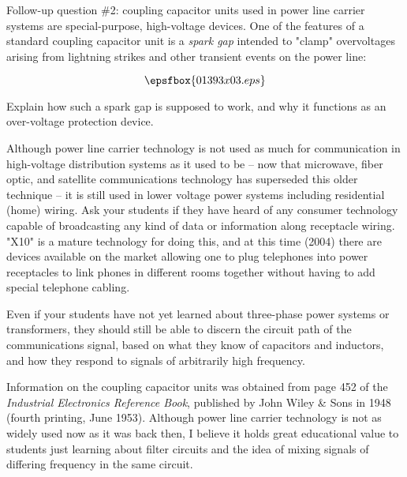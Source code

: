 \vskip 10pt

Follow-up question \#2: coupling capacitor units used in power line carrier systems are special-purpose, high-voltage devices.  One of the features of a standard coupling capacitor unit is a {\it spark gap} intended to "clamp" overvoltages arising from lightning strikes and other transient events on the power line:

$$\epsfbox{01393x03.eps}$$

Explain how such a spark gap is supposed to work, and why it functions as an over-voltage protection device.







Although power line carrier technology is not used as much for communication in high-voltage distribution systems as it used to be -- now that microwave, fiber optic, and satellite communications technology has superseded this older technique -- it is still used in lower voltage power systems including residential (home) wiring.  Ask your students if they have heard of any consumer technology capable of broadcasting any kind of data or information along receptacle wiring.  "X10" is a mature technology for doing this, and at this time (2004) there are devices available on the market allowing one to plug telephones into power receptacles to link phones in different rooms together without having to add special telephone cabling.

Even if your students have not yet learned about three-phase power systems or transformers, they should still be able to discern the circuit path of the communications signal, based on what they know of capacitors and inductors, and how they respond to signals of arbitrarily high frequency.

Information on the coupling capacitor units was obtained from page 452 of the {\it Industrial Electronics Reference Book}, published by John Wiley \& Sons in 1948 (fourth printing, June 1953).  Although power line carrier technology is not as widely used now as it was back then, I believe it holds great educational value to students just learning about filter circuits and the idea of mixing signals of differing frequency in the same circuit.




